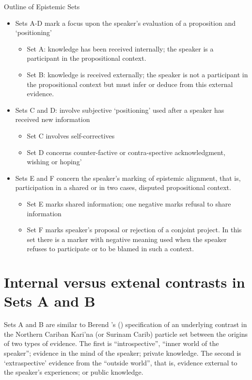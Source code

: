 \documentclass[output=paper]{langsci/langscibook}
\begin{document}
Outline of Epistemic Sets
\begin{itemize}
	\item Sets A-D mark a focus upon the speaker’s evaluation of a proposition and ‘positioning’%
	\begin{itemize}
		\item Set A: knowledge has been received internally; the speaker is a participant in the propositional context. 
		\item Set B: knowledge is received externally; the speaker is not a participant in the propositional context but must infer or deduce from this external evidence.     
	\end{itemize}    
	\item Sets C and D: involve subjective ‘positioning’ used after a speaker has received new information
	\begin{itemize}
		\item Set C involves self-correctives 
		\item Set D  concerns counter-factive or contra-spective acknowledgment,  wishing or hoping’
	\end{itemize}
	\item Sets E and F concern the speaker’s marking of epistemic alignment, that is, participation in a shared or in two cases, disputed propositional context. 
	\begin{itemize}
		\item Set E marks shared information; one negative marks refusal to share information
		\item Set F marks speaker’s proposal or rejection of a conjoint project. In this set there is a marker with negative meaning used when the speaker refuses to participate or to be blamed in such a context.
	\end{itemize}
\end{itemize}

\section{Internal versus extenal contrasts in Sets A and B}\label{s:eb2}

Sets A and B are similar to Berend \citeauthor{Hoff1986}’s (\citeyear{Hoff1986}) specification of an underlying contrast in the Northern Cariban Kari’na (or Surinam Carib) particle set between the origins of two types of evidence.  The first is “introspective”, “inner world of the speaker”; evidence in the mind of the speaker; private knowledge.  The second is ‘extraspective’ evidence from the “outside world”, that is, evidence external to the speaker’s experiences; or public knowledge. 
\end{document}
